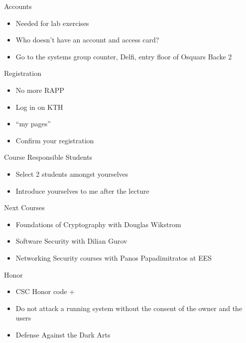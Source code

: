 \documentclass{beamer}
\begin{document}
\begin{frame}{Accounts}
  \begin{itemize}
  \item Needed for lab exercises
  \item Who doesn't have an account and access card?
  \item Go to the systems group counter, Delfi, entry 
floor of Osquars Backe 2
  \end{itemize}
\end{frame}

\begin{frame}{Registration}
  \begin{itemize}
    \item No more RAPP
    \item Log in on KTH
    \item ``my pages''
    \item Confirm your registration
  \end{itemize}
\end{frame}
 
\begin{frame}{Course Responsible Students }
  \begin{itemize}
  \item Select 2 students amongst yourselves 
  \item Introduce yourselves to me after the lecture 
  \end{itemize}
\end{frame}


\begin{frame}{Next Courses}
  \begin{itemize}
  \item Foundations of Cryptography with Douglas Wikstr\:om
  \item Software Security with Dilian Gurov
  \item Networking Security courses with Panos
    Papadimitratos at EES
  \end{itemize}
\end{frame}

\begin{frame}{Honor}
  \begin{itemize}
  \item CSC Honor code +
  \item \alert{Do not attack a running system 
    without the consent of the owner 
    and the users}
  \item Defense Against the Dark Arts
  \end{itemize}
\end{frame}
\end{document}
